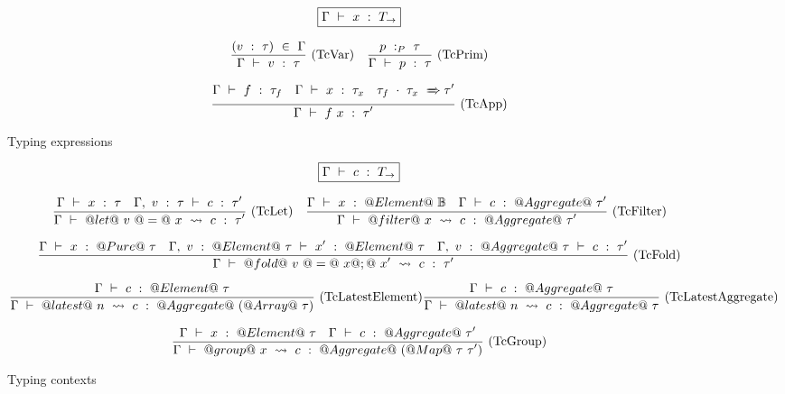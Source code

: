 \begin{figure}

$$
\boxed{\Gamma ~\vdash~ x ~:~ T_\to}
$$


$$
\frac {\displaystyle 
    (v~:~\tau) ~\in~ \Gamma
} {\displaystyle  
    \Gamma ~\vdash~ v ~:~ \tau
} \ 
\textrm{(TcVar)}
\quad
\frac {\displaystyle 
    p ~:_{P}~ \tau
} {\displaystyle 
    \Gamma ~\vdash~ p ~:~ \tau
} \ 
\textrm{(TcPrim)}
$$

$$
\frac {\displaystyle 
    \Gamma ~\vdash~ f ~:~ \tau_f
    \quad
    \Gamma ~\vdash~ x ~:~ \tau_x
    \quad
    \tau_f~\cdot~\tau_x ~\xRightarrow~ \tau'
} {\displaystyle 
    \Gamma ~\vdash~ f~x ~:~ \tau'
} \ 
\textrm{(TcApp)}
$$


\caption{Typing expressions}
\label{fig:source:type:exp}
\end{figure}

\begin{figure*}

$$
\boxed{\Gamma ~\vdash~ c ~:~ T_\to}
$$


$$
\frac {\displaystyle 
    \Gamma ~\vdash~ x ~:~ \tau
    \quad
    \Gamma,~v~:~\tau ~\vdash~ c ~:~ \tau'
} {\displaystyle 
    \Gamma ~\vdash~ @let@~v~@=@~x~\leadsto~c ~:~ \tau'
} \ 
\textrm{(TcLet)}
\quad
\frac {\displaystyle 
    \Gamma ~\vdash~ x ~:~ @Element@~\mathbb{B}
    \quad
    \Gamma ~\vdash~ c ~:~ @Aggregate@~\tau'
} {\displaystyle 
    \Gamma ~\vdash~ @filter@~x~\leadsto~c ~:~ @Aggregate@~\tau'
} \ 
\textrm{(TcFilter)}
$$

$$
\frac {\displaystyle 
    \Gamma ~\vdash~ x ~:~ @Pure@~\tau
    \quad
    \Gamma,~v~:~@Element@~\tau ~\vdash~ x' ~:~ @Element@~\tau
    \quad
    \Gamma,~v~:~@Aggregate@~\tau ~\vdash~ c ~:~ \tau'
} {\displaystyle 
    \Gamma ~\vdash~ @fold@~v~@=@~x@;@~x'~\leadsto~c ~:~ \tau'
} \ 
\textrm{(TcFold)}
$$

$$
\frac {\displaystyle 
    \Gamma ~\vdash~ c ~:~ @Element@~\tau
} {\displaystyle 
    \Gamma ~\vdash~ @latest@~n~\leadsto~c ~:~ @Aggregate@~(@Array@~\tau)
} \ 
\textrm{(TcLatestElement)}
\frac {\displaystyle 
    \Gamma ~\vdash~ c ~:~ @Aggregate@~\tau
} {\displaystyle 
    \Gamma ~\vdash~ @latest@~n~\leadsto~c ~:~ @Aggregate@~\tau
} \ 
\textrm{(TcLatestAggregate)}
$$

$$
\frac {\displaystyle 
    \Gamma ~\vdash~ x ~:~ @Element@~\tau
    \quad
    \Gamma ~\vdash~ c ~:~ @Aggregate@~\tau'
} {\displaystyle 
    \Gamma ~\vdash~ @group@~x~\leadsto~c ~:~ @Aggregate@~(@Map@~\tau~\tau')
} \ 
\textrm{(TcGroup)}
$$



\caption{Typing contexts}
\label{fig:source:type:ctx}
\end{figure*}

